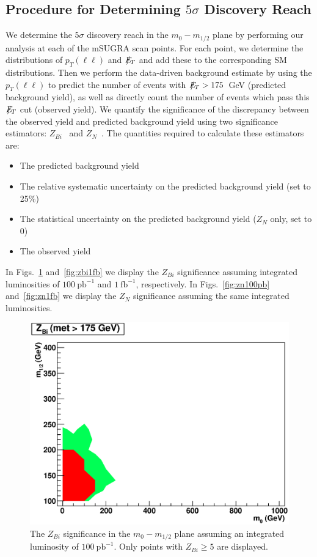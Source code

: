\subsection{Procedure for Determining $5\sigma$ Discovery Reach}
\label{sec:significance}

We  determine the  $5\sigma$  discovery reach  in the  $m_{0}-m_{1/2}$
plane by  performing our analysis at  each of the  mSUGRA scan points.
For each  point, we  determine the distributions  of $p_{T}(\ell\ell)$
and $E\!\!\!\!/_T$ and add these  to the corresponding SM distributions.  Then
we  perform   the  data-driven   background  estimate  by   using  the
$p_{T}(\ell\ell)$ to predict the  number of events with $E\!\!\!\!/_T>175$~GeV
(predicted background yield), as well  as directly count the number of
events which pass  this $E\!\!\!\!/_T$ cut (observed yield).   We quantify the
significance  of  the  discrepancy  between  the  observed  yield  and
predicted   background  yield   using  two   significance  estimators:
$Z_{Bi}$~\cite{cite:cousins}    and    $Z_N$~\cite{cite:conway}.   The
quantities required to calculate these estimators are:

\begin{itemize}
\item The predicted background yield
\item The relative systematic  uncertainty on the predicted background
yield (set to 25\%)
\item The  statistical uncertainty  on the predicted  background yield
($Z_N$ only, set to 0)
\item The observed yield
\end{itemize}

In   Figs.~\ref{fig:zbi100pb}  and~\ref{fig:zbi1fb}  we   display  the
$Z_{Bi}$    significance   assuming    integrated    luminosities   of
$100~\mathrm{pb}^{-1}$  and  $1~\mathrm{fb}^{-1}$,  respectively.   In
Figs.~\ref{fig:zn100pb}  and~\ref{fig:zn1fb}  we  display the  $Z_{N}$
significance assuming the same integrated luminosities.

\begin{figure}[htb]
\begin{center}
\includegraphics[width=0.7\linewidth]{figs/hzbi175_100pb.eps}
\caption{The  $Z_{Bi}$  significance   in  the  $m_{0}-m_{1/2}$  plane
assuming  an  integrated  luminosity of  $100~\mathrm{pb}^{-1}$.  Only
points with $Z_{Bi}\geq5$ are displayed.  \label{fig:zbi100pb}}
\end{center}
\end{figure}

